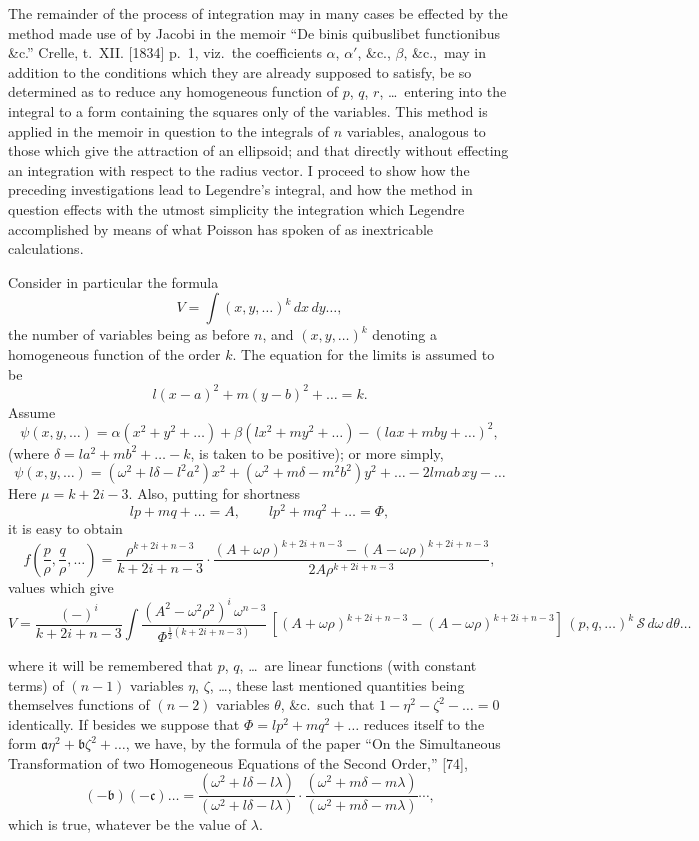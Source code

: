 \documentclass[11pt,a4paper]{book}
\begin{document}
The remainder of the process of integration may in many cases be effected by the method made use of by Jacobi in the memoir ``De binis quibuslibet functionibus \&c.'' Crelle, t.~XII. [1834] p.~1, viz.\ the coefficients $\alpha$, $\alpha'$, \&c., $\beta$, \&c.,\ may in addition to the conditions which they are already supposed to satisfy, be so determined as to reduce any homogeneous function of $p$, $q$, $r$, \ldots\ entering into the integral to a form containing the squares only of the variables. This method is applied in the memoir in question to the integrals of $n$ variables, analogous to those which give the attraction of an ellipsoid; and that directly without effecting an integration with respect to the radius vector. I proceed to show how the preceding investigations lead to Legendre's integral, and how the method in question effects with the utmost simplicity the integration which Legendre accomplished by means of what Poisson has spoken of as inextricable calculations.

Consider in particular the formula
\[
V = \int (x, y, \ldots)^{k}\, dx\, dy\ldots,
\]
the number of variables being as before $n$, and $(x, y, \ldots)^{k}$ denoting a homogeneous function of the order $k$. The equation for the limits is assumed to be
\[
l(x-a)^{2} + m(y-b)^{2} + \ldots = k.
\]
Assume
\[
\psi(x, y, \ldots) = \alpha(x^{2} + y^{2} + \ldots) + \beta(lx^{2} + my^{2} + \ldots) - (lax + mby + \ldots)^{2},
\]
(where $\delta = la^{2} + mb^{2} + \ldots - k$, is taken to be positive); or more simply,
\[
\psi(x, y, \ldots) = (\omega^{2} + l\delta - l^{2}a^{2})x^{2} + (\omega^{2} + m\delta - m^{2}b^{2})y^{2} + \ldots - 2lmab\,xy - \ldots
\]
Here $\mu = k + 2i - 3$. Also, putting for shortness
\[
lp + mq + \ldots = A, \qquad lp^{2} + mq^{2} + \ldots = \Phi,
\]
it is easy to obtain
\[
f\left(\frac{p}{\rho}, \frac{q}{\rho}, \ldots\right) = \frac{\rho^{k+2i+n-3}}{k + 2i + n - 3} \cdot \frac{(A + \omega\rho)^{k+2i+n-3} - (A - \omega\rho)^{k+2i+n-3}}{2A\rho^{k+2i+n-3}},
\]
values which give
\[
V = \frac{(-)^{i}}{k + 2i + n - 3} \int \frac{(A^{2} - \omega^{2}\rho^{2})^{i}\, \omega^{n-3}}{\Phi^{\frac{1}{2}(k+2i+n-3)}}\, [(A + \omega\rho)^{k+2i+n-3} - (A - \omega\rho)^{k+2i+n-3}]\, (p, q, \ldots)^{k}\, \mathcal{S}\, d\omega\, d\theta\ldots
\]

\newpage

\setcounter{page}{443}

where it will be remembered that $p$, $q$, \ldots\ are linear functions (with constant terms) of $(n-1)$ variables $\eta$, $\zeta$, \ldots, these last mentioned quantities being themselves functions of $(n-2)$ variables $\theta$, \&c.\ such that $1 - \eta^{2} - \zeta^{2} - \ldots = 0$ identically. If besides we suppose that $\Phi = lp^{2} + mq^{2} + \ldots$ reduces itself to the form $\mathfrak{a}\eta^{2} + \mathfrak{b}\zeta^{2} + \ldots$, we have, by the formula of the paper ``On the Simultaneous Transformation of two Homogeneous Equations of the Second Order,'' [74],
\[
(-\mathfrak{b})(-\mathfrak{c})\ldots =
\frac{(\omega^{2} + l\delta - l\lambda)}{(\omega^{2} + l\delta - l\lambda)} \cdot \frac{(\omega^{2} + m\delta - m\lambda)}{(\omega^{2} + m\delta - m\lambda)} \cdots,
\]
which is true, whatever be the value of $\lambda$.
\end{document}
